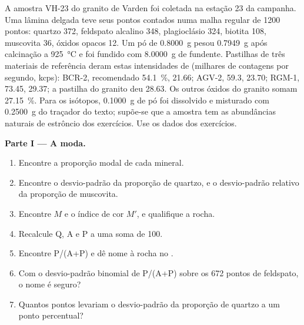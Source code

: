 \begin{problem}\label{pb:b2:field-lab-methods-2:1}
A amostra VH-23 do granito de Varden foi coletada na estação 23 da campanha. Uma lâmina delgada teve
seus pontos contados numa malha regular de 1200 pontos: quartzo 372, feldspato alcalino 348, plagioclásio 324,
biotita 108, muscovita 36, óxidos opacos 12. Um pó de \qty{0.8000}{g} pesou \qty{0.7949}{g}
após calcinação a \qty{925}{\celsius} e foi fundido com \qty{8.0000}{g} de fundente. Pastilhas de três
materiais de referência deram estas intensidades de  (milhares de contagens por segundo, kcps): BCR-2,
recomendado \qty{54.1}{\percent}, 21.66; AGV-2, 59.3, 23.70; RGM-1, 73.45, 29.37; a pastilha do granito
deu 28.63. Os outros óxidos do granito somam \qty{27.15}{\percent}. Para os isótopos,
\qty{0.1000}{g} de pó foi dissolvido e misturado com \qty{0.2500}{g} do traçador do texto;
supõe-se que a amostra tem as abundâncias naturais de estrôncio dos exercícios. Use os dados dos
exercícios.

\noindent\textbf{Parte I --- A moda.}
\begin{enumerate}
  \item Encontre a proporção modal de cada mineral.
  \item Encontre o desvio-padrão da proporção de quartzo, e o desvio-padrão relativo
        da proporção de muscovita.
  \item Encontre $M$ e o índice de cor $M'$, e qualifique a rocha.
  \item Recalcule Q, A e P a uma soma de 100.
  \item Encontre P/(A+P) e dê nome à rocha no .
  \item Com o desvio-padrão binomial de P/(A+P) sobre os 672 pontos de feldspato, o nome
        é seguro?
  \item Quantos pontos levariam o desvio-padrão da proporção de quartzo a um
        ponto percentual?
\end{enumerate}


\end{problem}
